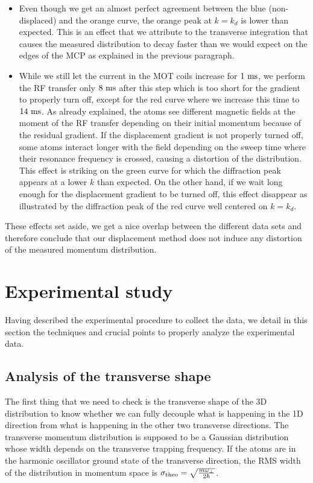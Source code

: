 \begin{itemize}
    \item Even though we get an almost perfect agreement between the blue (non-displaced) and the orange curve, the orange peak at $k=k_d$ is lower than expected. This is an effect that we attribute to the transverse integration that causes the measured distribution to decay faster than we would expect on the edges of the MCP as explained in the previous paragraph. 
    \item While we still let the current in the MOT coils increase for $1 \ \rm{ms}$, we perform the RF transfer only $8 \ \rm{ms}$ after this step which is too short for the gradient to properly turn off, except for the red curve where we increase this time to $14 \ \rm{ms}$. As already explained, the atoms see different magnetic fields at the moment of the RF transfer depending on their initial momentum because of the residual gradient. If the displacement gradient is not properly turned off, some atoms interact longer with the field depending on the sweep time where their resonance frequency is crossed, causing a distortion of the distribution. This effect is striking on the green curve for which the diffraction peak appears at a lower $k$ than expected. On the other hand, if we wait long enough for the displacement gradient to be turned off, this effect disappear as illustrated by the diffraction peak of the red curve well centered on $k=k_d$.
\end{itemize}

These effects set aside, we get a nice overlap between the different data sets and therefore conclude that our displacement method does not induce any distortion of the measured momentum distribution. 

\section{Experimental study}

Having described the experimental procedure to collect the data, we detail in this section the techniques and crucial points to properly analyze the experimental data.

\subsection{Analysis of the transverse shape}

The first thing that we need to check is the transverse shape of the 3D distribution to know whether we can fully decouple what is happening in the 1D direction from what is happening in the other two transverse directions. The transverse momentum distribution is supposed to be a Gaussian distribution whose width depends on the transverse trapping frequency. If the atoms are in the harmonic oscillator ground state of the transverse direction, the RMS width of the distribution in momentum space is $\sigma_{\rm{theo}}=\sqrt{\frac{m \omega_{\perp}}{2 \hbar}}$. 

